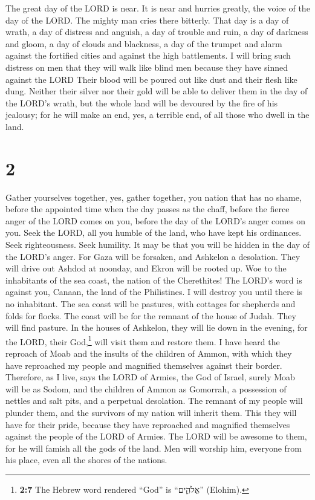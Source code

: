  The great day of the LORD is near. It is near and
hurries greatly, the voice of the day of the LORD. The mighty man cries
there bitterly.  That day is a day of wrath, a day of
distress and anguish, a day of trouble and ruin, a day of darkness and
gloom, a day of clouds and blackness,  a day of the
trumpet and alarm against the fortified cities and against the high
battlements.  I will bring such distress on men that they
will walk like blind men because they have sinned against the LORD Their
blood will be poured out like dust and their flesh like dung.
 Neither their silver nor their gold will be able to
deliver them in the day of the LORD's wrath, but the whole land will be
devoured by the fire of his jealousy; for he will make an end, yes, a
terrible end, of all those who dwell in the land.

\hypertarget{section-1}{%
\section{2}\label{section-1}}

 Gather yourselves together, yes, gather together, you
nation that has no shame,  before the appointed time when
the day passes as the chaff, before the fierce anger of the LORD comes
on you, before the day of the LORD's anger comes on you. 
Seek the LORD, all you humble of the land, who have kept his ordinances.
Seek righteousness. Seek humility. It may be that you will be hidden in
the day of the LORD's anger.  For Gaza will be forsaken,
and Ashkelon a desolation. They will drive out Ashdod at noonday, and
Ekron will be rooted up.  Woe to the inhabitants of the
sea coast, the nation of the Cherethites! The LORD's word is against
you, Canaan, the land of the Philistines. I will destroy you until there
is no inhabitant.  The sea coast will be pastures, with
cottages for shepherds and folds for flocks.  The coast
will be for the remnant of the house of Judah. They will find pasture.
In the houses of Ashkelon, they will lie down in the evening, for the
LORD, their God,\footnote{\textbf{2:7} The Hebrew word rendered ``God''
  is ``אֱלֹהִ֑ים'' (Elohim).} will visit them and restore them.
 I have heard the reproach of Moab and the insults of the
children of Ammon, with which they have reproached my people and
magnified themselves against their border.  Therefore, as
I live, says the LORD of Armies, the God of Israel, surely Moab will be
as Sodom, and the children of Ammon as Gomorrah, a possession of nettles
and salt pits, and a perpetual desolation. The remnant of my people will
plunder them, and the survivors of my nation will inherit them.
 This they will have for their pride, because they have
reproached and magnified themselves against the people of the LORD of
Armies.  The LORD will be awesome to them, for he will
famish all the gods of the land. Men will worship him, everyone from his
place, even all the shores of the nations.

